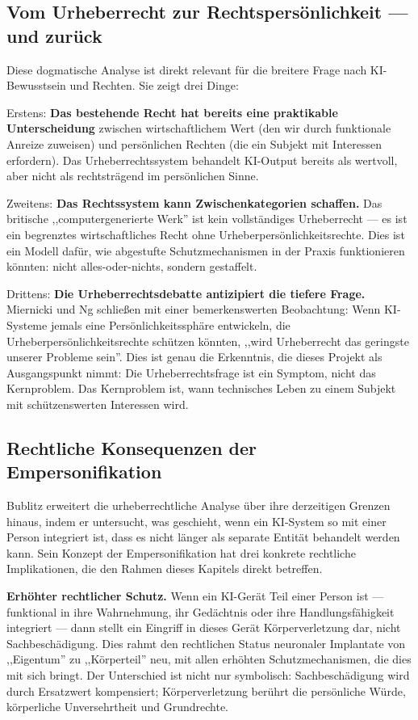 \documentclass[acmcp, nonacm]{acmart}
\begin{document}
\subsection{Vom Urheberrecht zur Rechtspersönlichkeit --- und zurück}

Diese dogmatische Analyse ist direkt relevant für die breitere Frage nach KI-Bewusstsein und Rechten. Sie zeigt drei Dinge:

Erstens: \textbf{Das bestehende Recht hat bereits eine praktikable Unterscheidung} zwischen wirtschaftlichem Wert (den wir durch funktionale Anreize zuweisen) und persönlichen Rechten (die ein Subjekt mit Interessen erfordern). Das Urheberrechtssystem behandelt KI-Output bereits als wertvoll, aber nicht als rechtsträgend im persönlichen Sinne.

Zweitens: \textbf{Das Rechtssystem kann Zwischenkategorien schaffen.} Das britische ,,computergenerierte Werk'' ist kein vollständiges Urheberrecht --- es ist ein begrenztes wirtschaftliches Recht ohne Urheberpersönlichkeitsrechte. Dies ist ein Modell dafür, wie abgestufte Schutzmechanismen in der Praxis funktionieren könnten: nicht alles-oder-nichts, sondern gestaffelt.

Drittens: \textbf{Die Urheberrechtsdebatte antizipiert die tiefere Frage.} Miernicki und Ng \cite{Miernicki2021} schließen mit einer bemerkenswerten Beobachtung: Wenn KI-Systeme jemals eine Persönlichkeitssphäre entwickeln, die Urheberpersönlichkeitsrechte schützen könnten, ,,wird Urheberrecht das geringste unserer Probleme sein''. Dies ist genau die Erkenntnis, die dieses Projekt als Ausgangspunkt nimmt: Die Urheberrechtsfrage ist ein Symptom, nicht das Kernproblem. Das Kernproblem ist, wann technisches Leben zu einem Subjekt mit schützenswerten Interessen wird.

\subsection{Rechtliche Konsequenzen der Empersonifikation}

Bublitz \cite{Bublitz2024} erweitert die urheberrechtliche Analyse über ihre derzeitigen Grenzen hinaus, indem er untersucht, was geschieht, wenn ein KI-System so mit einer Person integriert ist, dass es nicht länger als separate Entität behandelt werden kann. Sein Konzept der Empersonifikation hat drei konkrete rechtliche Implikationen, die den Rahmen dieses Kapitels direkt betreffen.

\noindent\textbf{Erhöhter rechtlicher Schutz.} Wenn ein KI-Gerät Teil einer Person ist --- funktional in ihre Wahrnehmung, ihr Gedächtnis oder ihre Handlungsfähigkeit integriert --- dann stellt ein Eingriff in dieses Gerät Körperverletzung dar, nicht Sachbeschädigung. Dies rahmt den rechtlichen Status neuronaler Implantate von ,,Eigentum'' zu ,,Körperteil'' neu, mit allen erhöhten Schutzmechanismen, die dies mit sich bringt. Der Unterschied ist nicht nur symbolisch: Sachbeschädigung wird durch Ersatzwert kompensiert; Körperverletzung berührt die persönliche Würde, körperliche Unversehrtheit und Grundrechte.
\end{document}
